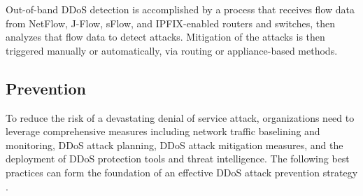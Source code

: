 \documentclass[a4paper, 12pt]{report} %
\begin{document}
                        Out-of-band DDoS detection is accomplished by a process that receives flow data from NetFlow, J-Flow, sFlow, and IPFIX-enabled routers and switches, then analyzes that flow data to detect attacks. Mitigation of the attacks is then triggered manually or automatically, via routing or appliance-based methods.

                    \subsection{Prevention}

                    To reduce the risk of a devastating denial of service attack, organizations need to leverage comprehensive measures including network traffic baselining and monitoring, DDoS attack planning, DDoS attack mitigation measures, and the deployment of DDoS protection tools and threat intelligence. The following best practices can form the foundation of an effective DDoS attack prevention strategy \cite{ddos_prevention}.
\end{document}
